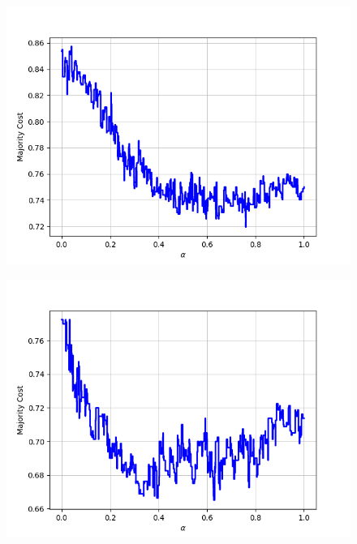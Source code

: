 \begin{figure}[H]
\begin{minipage}{.24\textwidth}
\end{minipage}
\begin{minipage}{.24\textwidth}
  \centering
  {\includegraphics[width=\linewidth]{plots/omniglot-intra-ac/Arcadian}}
\end{minipage}
\begin{minipage}{.24\textwidth}
  \centering
  {\includegraphics[width=\linewidth]{plots/omniglot-intra-ac/Armenian}}
\end{minipage}
\begin{minipage}{.24\textwidth}
  \centering

\end{minipage}
\end{figure}

